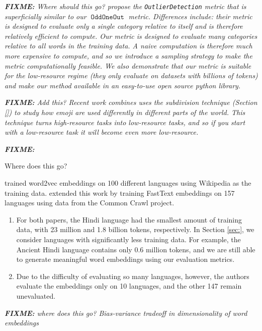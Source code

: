 \documentclass[11pt,a4paper]{article}
\DeclareMathOperator{\OddOneOut}{\texttt{OddOneOut}}
\newcommand{\fixme}[1]{{\color{red}\itshape \textbf{FIXME:} {#1}}}
\begin{document}
\fixme{Where should this go?
\citet{camacho-collados-navigli-2016-find} propose the \texttt{OutlierDetection} metric that is superficially similar to our $\OddOneOut$ metric.
Differences include: their metric is designed to evaluate only a single category relative to itself and is therefore relatively efficient to compute.
Our metric is designed to evaluate many categories relative to all words in the training data.
A naive computation is therefore much more expensive to compute,
and so we introduce a sampling strategy to make the metric computationally feasible.
We also demonstrate that our metric is suitable for the low-resource regime (they only evaluate on datasets with billions of tokens) and make our method available in an easy-to-use open source python library.
}

\fixme{Add this?
Recent work \citet{guntuku2019studying} combines uses the subdivision technique (Section \ref{}) to study how emoji are used differently in different parts of the world.
This technique turns high-resource tasks into low-resource tasks,
and so if you start with a low-resource task it will become even more low-resource.
}

\fixme{
Where does this go?

\citet{al2013polyglot} trained word2vec embeddings on 100 different languages using Wikipedia as the training data.
\citet{grave2018learning} extended this work by training FastText embeddings on 157 languages using data from the Common Crawl project.
\begin{enumerate}
\item
For both papers, the Hindi language had the smallest amount of training data,
with 23 million and 1.8 billion tokens, respectively.
In Section \ref{sec:}, we consider languages with significantly less training data.
For example, the Ancient Hindi language contains only 0.6 million tokens,
and we are still able to generate meaningful word embeddings using our evaluation metrics.

\item
Due to the difficulty of evaluating so many languages, however, the authors evaluate the embeddings only on 10 languages,
and the other 147 remain unevaluated.
\end{enumerate}
}


\fixme{where does this go?
Bias-variance tradeoff in dimensionality of word embeddings \cite{yin2018dimensionality}
}


\end{document}
